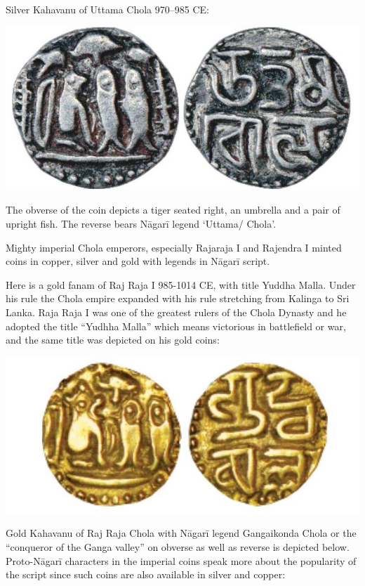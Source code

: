 Silver Kahavanu of Uttama Chola 970–985 CE:

\vskip 5pt

\centerline{\includegraphics[scale=1.1]{"images/article-06/art06-fig08.jpg"}}

The obverse of the coin depicts a tiger seated right, an umbrella and a pair of upright fish. The reverse bears Nāgarī legend ‘Uttama/ Chola’.

Mighty imperial Chola emperors, especially Rajaraja I and Rajendra I minted coins in copper, silver and gold with legends in Nāgarī script.

Here is a gold fanam of Raj Raja I 985-1014 CE, with title Yuddha Malla. Under his rule the Chola empire expanded with his rule stretching from Kalinga to Sri Lanka. Raja Raja I was one of the greatest rulers of the Chola Dynasty and he adopted the title “Yudhha Malla” which means victorious in battlefield or war, and the same title was depicted on his gold coins:

\vskip 4pt

\centerline{\includegraphics[scale=0.95]{"images/article-06/art06-fig09.jpg"}}

Gold Kahavanu of Raj Raja Chola with Nāgarī legend Gangaikonda Chola or the “conqueror of the Ganga valley” on obverse as well as reverse is depicted below. Proto-Nāgarī characters in the imperial coins speak more about the popularity of the script since such coins are also available in silver and copper:

